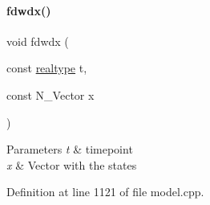 \paragraph{\texorpdfstring{fdwdx()}{fdwdx()}\hspace{0.1cm}{\footnotesize\ttfamily [1/2]}}
{\footnotesize\ttfamily void fdwdx (\begin{DoxyParamCaption}\item[{const \mbox{\hyperlink{namespaceamici_a1bdce28051d6a53868f7ccbf5f2c14a3}{realtype}}}]{t,  }\item[{const N\+\_\+\+Vector}]{x }\end{DoxyParamCaption})}


\begin{DoxyParams}{Parameters}
{\em t} & timepoint \\
\hline
{\em x} & Vector with the states \\
\hline
\end{DoxyParams}


Definition at line 1121 of file model.\+cpp.

